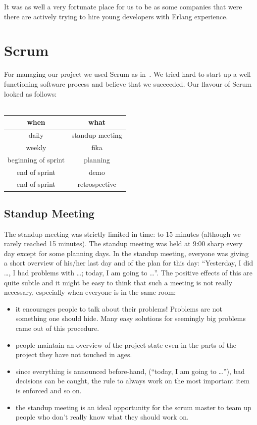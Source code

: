 \documentclass[11pt,a4paper]{report}
\begin{document}
It was as well a very fortunate place for us to be as some companies that were
there are actively trying to hire young developers with Erlang experience.
\section{Scrum}
For managing our project we used Scrum as in~\cite{kniberg}.
We tried hard to start up a well functioning software process and believe that
we succeeded. Our flavour of Scrum looked as follows: \\ \\
\begin{tabular}{cc}
  when & what \\ \hline
  daily & standup meeting\\
  weekly & fika \\
  beginning of sprint & planning \\
  end of sprint & demo \\
  end of sprint & retrospective \\
\end{tabular}

\subsection{Standup Meeting}
The standup meeting was strictly limited in time: to 15 minutes (although we
rarely reached 15 minutes). The standup meeting was held at 9:00 sharp every day
except for some planning days. In the standup meeting, everyone was giving a
short overview of his/her last day and of the plan for this day: ``Yesterday, I
did \ldots, I had problems with \ldots; today, I am going to \ldots''.
The positive effects of this are quite subtle and it might be easy to think that
such a meeting is not really necessary, especially when everyone is in the same
room:

\begin{itemize}
\item it encourages people to talk about their problems!
  Problems are not something one should hide. Many easy solutions for seemingly
  big problems came out of this procedure.
\item people maintain an overview of the project state even in the parts of the
  project they have not touched in ages.
\item since everything is announced before-hand,
  (``today, I am going to \ldots''), bad decisions can be caught, the rule to
  always work on the most important item is enforced and so on.
\item the standup meeting is an ideal opportunity for the scrum master to team
  up people who don't really know what they should work on.
\end{itemize}
\end{document}
